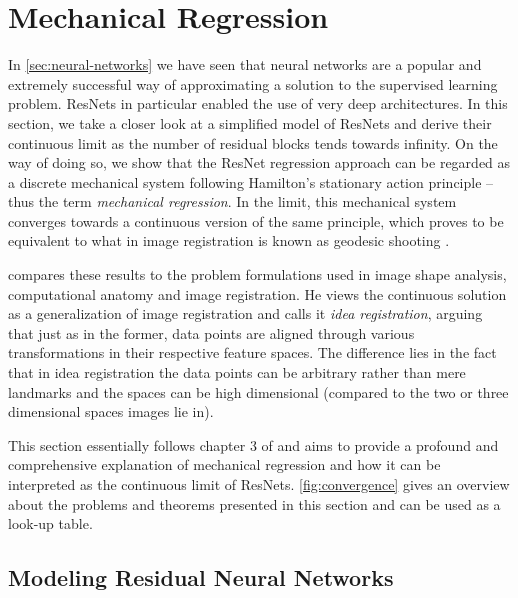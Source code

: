 \section{Mechanical Regression}
\label{sec:mechanical-regression}

In \cref{sec:neural-networks} we have seen that neural networks are a popular and extremely successful way of approximating a solution to the supervised learning problem.
ResNets in particular enabled the use of very deep architectures.
In this section, we take a closer look at a simplified model of ResNets and derive their continuous limit as the number of residual blocks tends towards infinity.
On the way of doing so, we show that the ResNet regression approach can be regarded as a discrete mechanical system following Hamilton's stationary action principle -- thus the term \emph{mechanical regression}.
In the limit, this mechanical system converges towards a continuous version of the same principle, which proves to be equivalent to what in image registration is known as geodesic shooting \cite{allassonniere05}.

\citet{owhadi20} compares these results to the problem formulations used in image shape analysis, computational anatomy and image registration.
He views the continuous solution as a generalization of image registration and calls it \emph{idea registration}, arguing that just as in the former, data points are aligned through various transformations in their respective feature spaces.
The difference lies in the fact that in idea registration the data points can be arbitrary rather than mere landmarks and the spaces can be high dimensional (compared to the two or three dimensional spaces images lie in).

This section essentially follows chapter 3 of \cite{owhadi20} and aims to provide a profound and comprehensive explanation of mechanical regression and how it can be interpreted as the continuous limit of ResNets.
\cref{fig:convergence} gives an overview about the problems and theorems presented in this section and can be used as a look-up table.

\subsection{Modeling Residual Neural Networks}
\label{sec:resnet-model}

